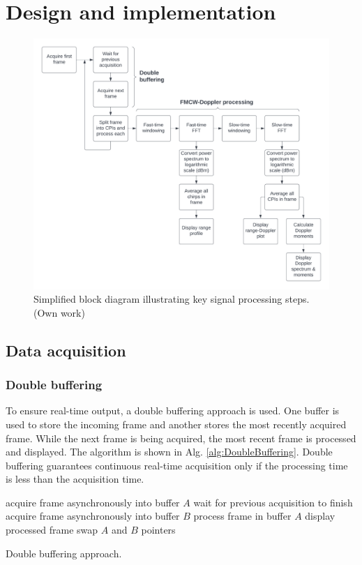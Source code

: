 \documentclass{article}
\begin{document}
\section{Design and implementation}
\begin{figure}
	\centering
	\includegraphics[width=\textwidth]{signal-processing-diagram}
	\caption{Simplified block diagram illustrating key signal processing steps. (Own work)}
	\label{fig:SignalProcessingDiagram}
\end{figure}

\subsection{Data acquisition}
\subsubsection{Double buffering}
To ensure real-time output, a double buffering approach is used.
One buffer is used to store the incoming frame and another stores the most recently acquired frame.
While the next frame is being acquired, the most recent frame is processed and displayed. The algorithm is shown in Alg. \ref{alg:DoubleBuffering}. Double buffering guarantees continuous real-time acquisition only if the processing time is less than the acquisition time.

\begin{algorithm}
	\centering
	\begin{algorithmic}
		\State acquire frame asynchronously into buffer $A$
		\State wait for previous acquisition to finish
		\State acquire frame asynchronously into buffer $B$
		\State process frame in buffer $A$
		\State display processed frame
		\State swap $A$ and $B$ pointers
		\EndWhile
	\end{algorithmic}
	\caption{Double buffering approach.}\label{alg:DoubleBuffering}
\end{algorithm}
\end{document}
